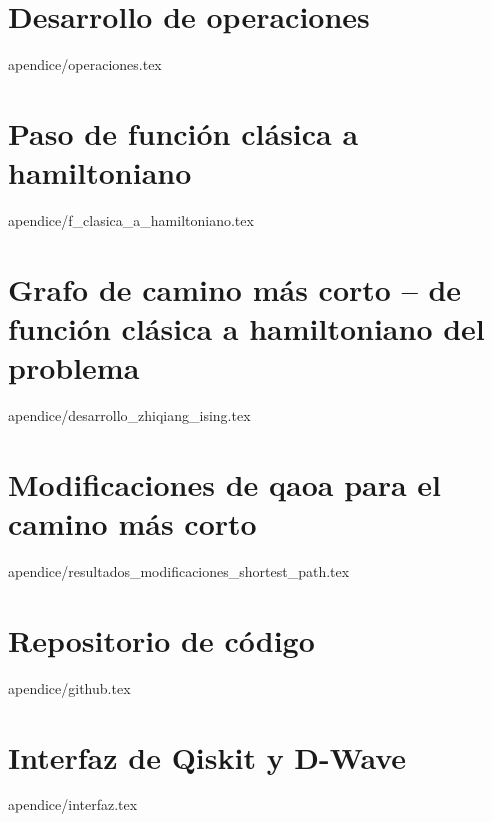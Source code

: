 \documentclass[epsbased,copyright,final,printable,covers,extendedindex,firstnumbered,tfg,lof,lot]{tfgtfmthesisuam}
\begin{document}
\chapter{Desarrollo de operaciones}{apendice/operaciones.tex}
\chapter{Paso de función clásica a hamiltoniano\label{CAP:F_CLASICA_A_HAMILTONIANO}}{apendice/f_clasica_a_hamiltoniano.tex}
\chapter{Grafo de camino más corto {--} de función clásica a hamiltoniano del problema\label{CAP:DESARROLLO_ZHIQIANG_ISING}}{apendice/desarrollo_zhiqiang_ising.tex}
\chapter{Modificaciones de qaoa para el camino más corto\label{CAP:OTRAS_SOLUCIONES}}{apendice/resultados_modificaciones_shortest_path.tex}
\chapter{Repositorio de código\label{CAP:github}}{apendice/github.tex}
\chapter{Interfaz de Qiskit y D-Wave}{apendice/interfaz.tex}
\end{document}
